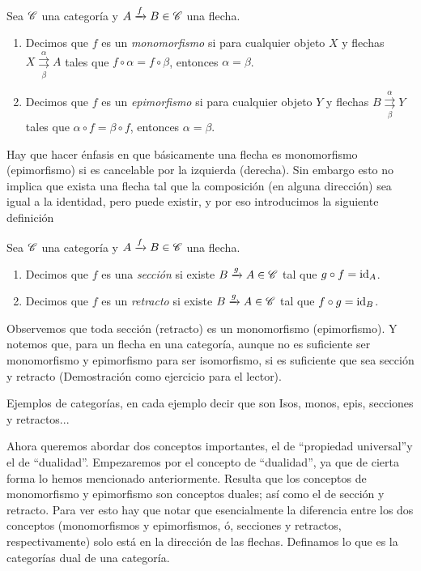 \documentclass{comunicaciones}
\begin{document}
\begin{dfn}
    Sea $\mathscr C$ una categoría y $A\xrightarrow{f}B\in\mathscr C$ una flecha. 
    \begin{enumerate}
        \item Decimos que $f$ es un \emph{monomorfismo} si para cualquier objeto $X$ y flechas $X\overset{\alpha}{\underset{\beta}{\rightrightarrows}}A$
              tales que $f\circ\alpha=f\circ\beta$, entonces $\alpha=\beta$. 
        \item Decimos que $f$ es un \emph{epimorfismo} si para cualquier objeto $Y$ y flechas $B\overset{\alpha}{\underset{\beta}{\rightrightarrows}}Y$
              tales que $\alpha\circ f=\beta\circ f$, entonces $\alpha=\beta$.
    \end{enumerate}
\end{dfn}
Hay que hacer énfasis en que básicamente una flecha es monomorfismo (epimorfismo) si es cancelable por la izquierda (derecha). Sin embargo esto no implica
que exista una flecha tal que la composición (en alguna dirección) sea igual a la identidad, pero puede existir, y por eso introducimos la siguiente definición
\begin{dfn}
    Sea $\mathscr C$ una categoría y $A\xrightarrow{f}B\in\mathscr C$ una flecha. 
    \begin{enumerate}
        \item Decimos que $f$ es una \emph{sección} si existe $B\xrightarrow{g}A\in\mathscr C$ tal que $g\circ f=\mathrm{id}_A$. 
        \item Decimos que $f$ es un \emph{retracto} si existe $B\xrightarrow{g}A\in\mathscr C$ tal que $f\circ g=\mathrm{id}_B$.
    \end{enumerate}
\end{dfn}

Observemos que toda sección (retracto) es un monomorfismo (epimorfismo). Y notemos que, para un flecha en una categoría, aunque no es suficiente ser monomorfismo
y epimorfismo para ser isomorfismo, si es suficiente que sea sección y retracto (Demostración como ejercicio para el lector).

Ejemplos de categorías, en cada ejemplo decir que son Isos, monos, epis, secciones y retractos...

Ahora queremos abordar dos conceptos importantes, el de \textquotedblleft propiedad universal\textquotedblright y el de \textquotedblleft dualidad\textquotedblright .
Empezaremos por el concepto de \textquotedblleft dualidad\textquotedblright , ya que de cierta forma lo hemos mencionado anteriormente. Resulta que los conceptos de
monomorfismo y epimorfismo son conceptos duales; así como el de sección y retracto. Para ver esto hay que notar que esencialmente la diferencia 
entre los dos conceptos (monomorfismos y epimorfismos, ó, secciones y retractos, respectivamente) solo está en la dirección de las flechas. 
Definamos lo que es la categorías dual de una categoría. 
\end{document}
